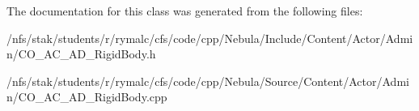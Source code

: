 The documentation for this class was generated from the following files:\begin{DoxyCompactItemize}
\item 
/nfs/stak/students/r/rymalc/cfs/code/cpp/Nebula/Include/Content/Actor/Admin/CO\_\-AC\_\-AD\_\-RigidBody.h\item 
/nfs/stak/students/r/rymalc/cfs/code/cpp/Nebula/Source/Content/Actor/Admin/CO\_\-AC\_\-AD\_\-RigidBody.cpp\end{DoxyCompactItemize}
